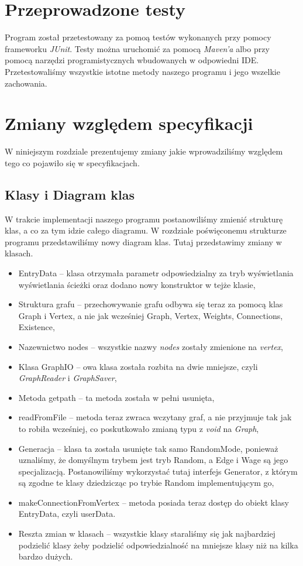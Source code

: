 \documentclass[10pt, a4paper]{report}
\begin{document}
  \newpage

\section{Przeprowadzone testy}\label{sec:przeprowadzone-testy}
Program został przetestowany za pomoą testów wykonanych przy pomocy frameworku \textit{JUnit}. Testy można uruchomić za pomocą \textit{Maven'a} albo przy pomocą narzędzi programistycznych wbudowanych w odpowiedni IDE.
Przetestowaliśmy wszystkie istotne metody naszego programu i jego wszelkie zachowania.

\section{Zmiany względem specyfikacji}\label{sec:zmiany-względem-specyfikacji}
W niniejszym rozdziale prezentujemy zmiany jakie wprowadziliśmy względem tego co pojawiło się w specyfikacjach.

\subsection{Klasy i Diagram klas}\label{subsec:klasy-i-diagram-klas}
W trakcie implementacji naszego programu postanowiliśmy zmienić strukturę klas, a co za tym idzie całego diagramu. W rozdziale poświęconemu strukturze programu przedstawiliśmy nowy diagram klas.
Tutaj przedstawimy zmiany w klasach.
\begin{itemize}
  \item EntryData -- klasa otrzymała parametr odpowiedzialny za tryb wyświetlania wyświetlania ścieżki oraz dodano nowy konstruktor w tejże klasie,
  \item Struktura grafu -- przechowywanie grafu odbywa się teraz za pomocą klas Graph i Vertex, a nie jak wcześniej Graph, Vertex, Weights, Connections, Existence,
  \item Nazewnictwo nodes -- wszystkie nazwy \textit{nodes} zostały zmienione na \textit{vertex},
  \item Klasa GraphIO -- owa klasa została rozbita na dwie mniejsze, czyli \textit{GraphReader} i \textit{GraphSaver},
  \item Metoda getpath -- ta metoda została w pełni usunięta,
  \item readFromFile -- metoda teraz zwraca wczytany graf, a nie przyjmuje tak jak to robiła wcześniej, co poskutkowało zmianą typu z \textit{void} na \textit{Graph},
  \item Generacja -- klasa ta została usunięte tak samo RandomMode, ponieważ uznaliśmy, że domyślnym trybem jest tryb Random, a Edge i Wage są jego specjalizacją. Postanowiliśmy wykorzystać tutaj interfejs Generator, z którym są zgodne te klasy dziedzicząc po trybie Random implementującym go,
  \item makeConnectionFromVertex -- metoda posiada teraz dostęp do obiekt klasy EntryData, czyli userData.
  \item Reszta zmian w klasach -- wszystkie klasy staraliśmy się jak najbardziej podzielić klasy żeby podzielić odpowiedzialność na mniejsze klasy niż na kilka bardzo dużych.
\end{itemize}
\end{document}
